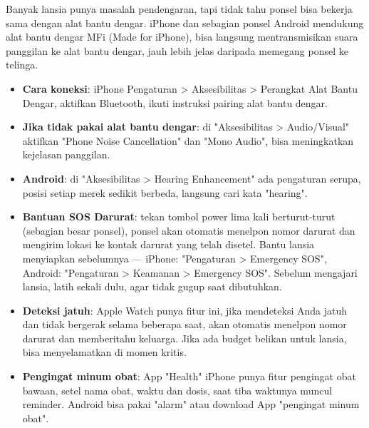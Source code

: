 
Banyak lansia punya masalah pendengaran, tapi tidak tahu ponsel bisa bekerja sama dengan alat bantu dengar. iPhone dan sebagian ponsel Android mendukung alat bantu dengar MFi (Made for iPhone), bisa langsung mentransmisikan suara panggilan ke alat bantu dengar, jauh lebih jelas daripada memegang ponsel ke telinga.

\begin{itemize}
  \item \textbf{Cara koneksi}: iPhone Pengaturan > Aksesibilitas > Perangkat Alat Bantu Dengar, aktifkan Bluetooth, ikuti instruksi pairing alat bantu dengar.
  \item \textbf{Jika tidak pakai alat bantu dengar}: di "Aksesibilitas > Audio/Visual" aktifkan "Phone Noise Cancellation" dan "Mono Audio", bisa meningkatkan kejelasan panggilan.
  \item \textbf{Android}: di "Aksesibilitas > Hearing Enhancement" ada pengaturan serupa, posisi setiap merek sedikit berbeda, langsung cari kata "hearing".
\end{itemize}


\begin{itemize}
  \item \textbf{Bantuan SOS Darurat}: tekan tombol power lima kali berturut-turut (sebagian besar ponsel), ponsel akan otomatis menelpon nomor darurat dan mengirim lokasi ke kontak darurat yang telah disetel. Bantu lansia menyiapkan sebelumnya — iPhone: "Pengaturan > Emergency SOS", Android: "Pengaturan > Keamanan > Emergency SOS". Sebelum mengajari lansia, latih sekali dulu, agar tidak gugup saat dibutuhkan.
  \item \textbf{Deteksi jatuh}: Apple Watch punya fitur ini, jika mendeteksi Anda jatuh dan tidak bergerak selama beberapa saat, akan otomatis menelpon nomor darurat dan memberitahu keluarga. Jika ada budget belikan untuk lansia, bisa menyelamatkan di momen kritis.
  \item \textbf{Pengingat minum obat}: App "Health" iPhone punya fitur pengingat obat bawaan, setel nama obat, waktu dan dosis, saat tiba waktunya muncul reminder. Android bisa pakai "alarm" atau download App "pengingat minum obat".
\end{itemize}

